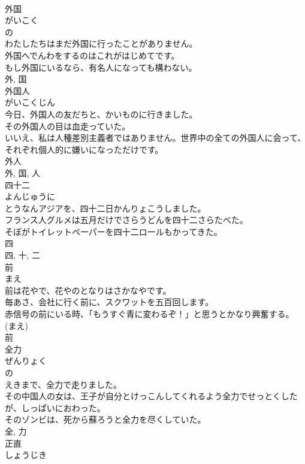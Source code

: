 \documentclass[8pt]{extreport}
\begin{document}
\begin{CJK}{UTF8}{min}
\\	外国	
\\	がいこく	
\\	の 
\\	わたしたちはまだ外国に行ったことがありません。	
\\	外国へでんわをするのはこれがはじめてです。	
\\	もし外国にいるなら、有名人になっても構わない。	
\\	外, 国	
\\	外国人	
\\	がいこくじん	
\\	今日、外国人の友だちと、かいものに行きました。	
\\	その外国人の目は血走っていた。	
\\	いいえ、私は人種差別主義者ではありません。世界中の全ての外国人に会って、それぞれ個人的に嫌いになっただけです。	
\\	外人 
\\	外, 国, 人	
\\	四十二	
\\	よんじゅうに	
\\	とうなんアジアを、四十二日かんりょこうしました。	
\\	フランス人グルメは五月だけでさらうどんを四十二さらたべた。	
\\	そぼがトイレットペーパーを四十二ロールもかってきた。	
\\	四 
\\	四, 十, 二	
\\	前	
\\	まえ	
\\	前は花やで、花やのとなりはさかなやです。	
\\	毎あさ、会社に行く前に、スクワットを五百回します。	
\\	赤信号の前にいる時、「もうすぐ青に変わるぞ！」と思うとかなり興奮する。	
\\	(まえ) 
\\	前	
\\	全力	
\\	ぜんりょく	
\\	の 
\\	えきまで、全力で走りました。	
\\	その中国人の女は、王子が自分とけっこんしてくれるよう全力でせっとくしたが、しっぱいにおわった。	
\\	そのゾンビは、死から蘇ろうと全力を尽くしていた。	
\\	全, 力	
\\	正直	
\\	しょうじき	

\end{CJK}
\end{document}
